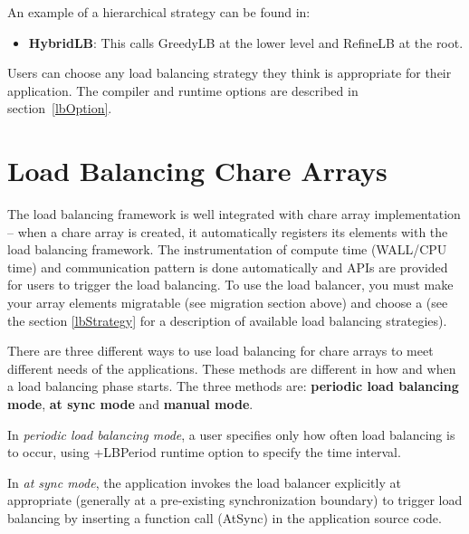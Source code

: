 An example of a hierarchical strategy can be found in:
\begin{itemize}
\item {\bf HybridLB}: This calls GreedyLB at the lower level and RefineLB at
the root.
\end{itemize}

Users can choose any load balancing strategy they think is appropriate for their
application. The compiler and runtime options are described in
section~\ref{lbOption}.


\section{Load Balancing Chare Arrays}
\label{lbarray}

The load balancing framework is well integrated with chare array implementation
-- when a chare array is created, it automatically registers its elements with
the load balancing framework. The instrumentation of compute time (WALL/CPU
time) and communication pattern is done automatically and APIs are provided
for users to trigger the load balancing.  To use the load balancer, you must
make your array elements migratable (see migration section above) and choose a
 (see the section \ref{lbStrategy} for a
description of available load balancing strategies).

There are three different ways to use load balancing for chare arrays to meet
different needs of the applications. These methods are different in how and
when a load balancing phase starts. The three methods are: {\bf periodic load
balancing mode}, {\bf at sync mode} and {\bf manual mode}.

In {\em periodic load balancing mode}, a user specifies only how often
load balancing is to occur, using +LBPeriod runtime option to specify
the time interval.

In {\em at sync mode}, the application invokes the load balancer
explicitly at appropriate (generally at a pre-existing synchronization
boundary) to trigger load balancing by inserting a function call
(AtSync) in the application source code.


